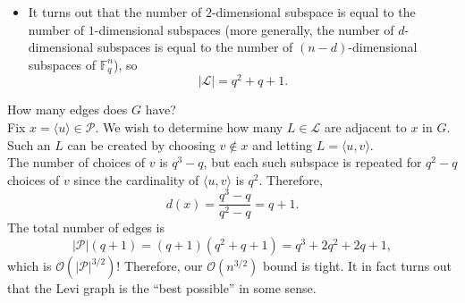 \documentclass{article}
\begin{document}
\begin{enumerate}
\begin{itemize}
				\item It turns out that the number of $2$-dimensional subspace is equal to the number of $1$-dimensional subspaces (more generally, the number of $d$-dimensional subspaces is equal to the number of $(n-d)$-dimensional subspaces of $\mathbb{F}_q^n$), so
				\[ |\mathcal{L}| = q^2 + q + 1. \]
			\end{itemize}
			How many edges does $G$ have?\\
			Fix $x = \langle u \rangle \in \mathcal{P}$. We wish to determine how many $L\in\mathcal{L}$ are adjacent to $x$ in $G$. Such an $L$ can be created by choosing $v \not\in x$ and letting $L = \langle u,v\rangle$.\\The number of choices of $v$ is $q^3 - q$, but each such subspace is repeated for $q^2 - q$ choices of $v$ since the cardinality of $\langle u,v\rangle$ is $q^2$. Therefore,
			\[ d(x) = \frac{q^3 - q}{q^2 - q} = q + 1. \]
			The total number of edges is
			\[ |\mathcal{P}| (q + 1) = (q+1)(q^2+q+1) = q^3 + 2q^2 + 2q + 1, \]
			which is $\mathcal{O}(|\mathcal{P}|^{3/2})$!
			Therefore, our $\mathcal{O}(n^{3/2})$ bound is tight. It in fact turns out that the Levi graph is the ``best possible'' in some sense.
		\end{enumerate}
\end{document}
